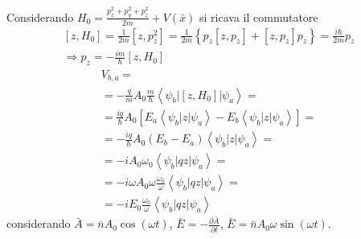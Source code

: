 Considerando $H_0=\frac{p_x^2+p_y^2+p_z^2}{2m}+V\left(\bar x\right)$ si ricava il commutatore
\begin{equation}\begin{split}
\left[z,H_0\right]=\frac{1}{2m}\left[z,p_z^2\right]=\frac{1}{2m}\left\{p_z\left[z,p_z\right]+\left[z,p_z\right]p_z\right\}=\frac{i\hbar }{2m}p_z\\
\Longrightarrow p_z=-\frac{im}{\hbar }\left[z,H_0\right]
\end{split}\end{equation}
\begin{equation}\begin{split}
V_{b,a}=\\
=-\frac{q}{m}A_0\frac{m}{\hbar }\left\langle \psi _b\left|\left[z,H_0\right]\right|\psi _a \right\rangle=\\
=\frac{iq}{\hbar }A_0\left[E_a\left\langle \psi _b|z|\psi _a \right\rangle-E_b\left\langle \psi _b|z|\psi _a \right\rangle\right]=\\
=-\frac{iq}{\hbar }A_0\left(E_b-E_a\right)\left\langle \psi _b|z|\psi _a \right\rangle=\\
=-iA_0\omega _0\left\langle \psi _b|qz|\psi _a \right\rangle=\\
=-i\omega A_0\omega \frac{\omega _0}{\omega }\left\langle \psi _b|qz|\psi _a \right\rangle=\\
=-iE_0\frac{\omega _0}{\omega }\left\langle \psi _b|qz|\psi _a \right\rangle
\end{split}\end{equation}
considerando $\bar A=\bar nA_0\cos{\left(\omega t\right)}$, $\bar E=-\frac{\partial \bar A}{\partial t}$, $\bar E=\bar nA_0\omega \sin{\left(\omega t\right)}$.